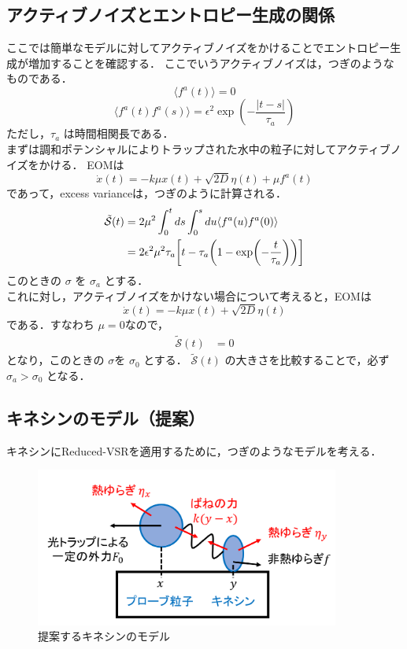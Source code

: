\documentclass{jsarticle}
\numberwithin{equation}{section}
\theoremstyle{definition}
\newcommand{\ave}[1]{\langle #1 \rangle}
\begin{document}
\subsection{アクティブノイズとエントロピー生成の関係}
ここでは簡単なモデルに対してアクティブノイズをかけることでエントロピー生成が増加することを確認する． 
ここでいうアクティブノイズは，つぎのようなものである．
\begin{equation}
  \ave{f^a (t)} = 0
\end{equation}
\begin{equation}
  \ave{f^a (t) f^a (s)} = \epsilon^2 \exp( - \frac{|t-s|}{\tau_a} )
\end{equation}
ただし，$\tau_a$ は時間相関長である．\\
\quad まずは調和ポテンシャルによりトラップされた水中の粒子に対してアクティブノイズをかける．
EOMは
\begin{equation}
  \dot{x}(t) = -k \mu x(t) + \sqrt{2D} \eta(t) + \mu f^a (t)
\end{equation}
であって，excess varianceは，つぎのように計算される．
\begin{align}
  \tilde{\mathcal{S}}(t) &= 2\mu^2 \int_0^t ds \int_0^s du \ave{ f^a(u) f^a(0) } \\
  &= 2 \epsilon^2 \mu^2 \tau_a \qty[ t - \tau_a \qty(1- \exp(-\frac{t}{\tau_a})) ]
\end{align}
このときの $\sigma$ を $\sigma_a$ とする．\\
\quad これに対し，アクティブノイズをかけない場合について考えると，EOMは
\begin{equation}
  \dot{x}(t) = -k \mu x(t) + \sqrt{2D} \eta(t)
\end{equation}
である．すなわち $\mu = 0$なので，
\begin{align}
  \tilde{\mathcal{S}}(t) &= 0
\end{align}
となり，このときの $\sigma$を $\sigma_0$ とする．
$\tilde{\mathcal{S}}(t)$ の大きさを比較することで，必ず $\sigma_a > \sigma_0$ となる．

\subsection{キネシンのモデル（提案）}
キネシンにReduced-VSRを適用するために，つぎのようなモデルを考える．

\begin{figure}[H]
  \begin{center}
  \includegraphics[width=10cm]{kinesine_suggest.png}
  \end{center}
  \caption{提案するキネシンのモデル}
\end{figure}
\end{document}
